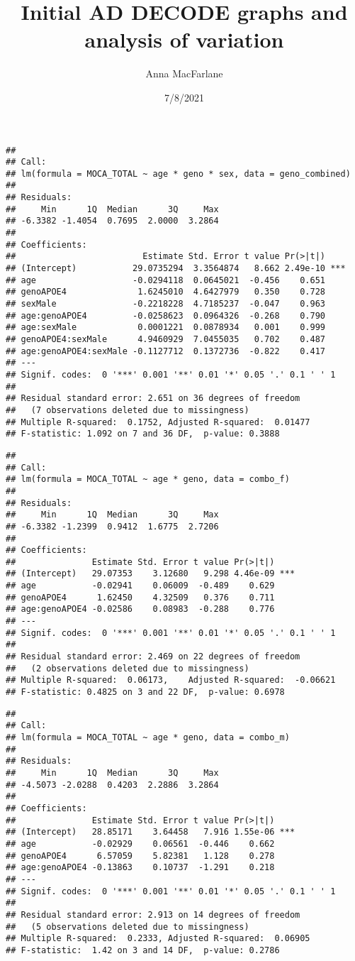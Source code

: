 \documentclass[
]{article}
\title{Initial AD DECODE graphs and analysis of variation}
\author{Anna MacFarlane}
\date{7/8/2021}
\begin{document}
\maketitle

\begin{verbatim}
## 
## Call:
## lm(formula = MOCA_TOTAL ~ age * geno * sex, data = geno_combined)
## 
## Residuals:
##     Min      1Q  Median      3Q     Max 
## -6.3382 -1.4054  0.7695  2.0000  3.2864 
## 
## Coefficients:
##                         Estimate Std. Error t value Pr(>|t|)    
## (Intercept)           29.0735294  3.3564874   8.662 2.49e-10 ***
## age                   -0.0294118  0.0645021  -0.456    0.651    
## genoAPOE4              1.6245010  4.6427979   0.350    0.728    
## sexMale               -0.2218228  4.7185237  -0.047    0.963    
## age:genoAPOE4         -0.0258623  0.0964326  -0.268    0.790    
## age:sexMale            0.0001221  0.0878934   0.001    0.999    
## genoAPOE4:sexMale      4.9460929  7.0455035   0.702    0.487    
## age:genoAPOE4:sexMale -0.1127712  0.1372736  -0.822    0.417    
## ---
## Signif. codes:  0 '***' 0.001 '**' 0.01 '*' 0.05 '.' 0.1 ' ' 1
## 
## Residual standard error: 2.651 on 36 degrees of freedom
##   (7 observations deleted due to missingness)
## Multiple R-squared:  0.1752, Adjusted R-squared:  0.01477 
## F-statistic: 1.092 on 7 and 36 DF,  p-value: 0.3888
\end{verbatim}

\begin{verbatim}
## 
## Call:
## lm(formula = MOCA_TOTAL ~ age * geno, data = combo_f)
## 
## Residuals:
##     Min      1Q  Median      3Q     Max 
## -6.3382 -1.2399  0.9412  1.6775  2.7206 
## 
## Coefficients:
##               Estimate Std. Error t value Pr(>|t|)    
## (Intercept)   29.07353    3.12680   9.298 4.46e-09 ***
## age           -0.02941    0.06009  -0.489    0.629    
## genoAPOE4      1.62450    4.32509   0.376    0.711    
## age:genoAPOE4 -0.02586    0.08983  -0.288    0.776    
## ---
## Signif. codes:  0 '***' 0.001 '**' 0.01 '*' 0.05 '.' 0.1 ' ' 1
## 
## Residual standard error: 2.469 on 22 degrees of freedom
##   (2 observations deleted due to missingness)
## Multiple R-squared:  0.06173,    Adjusted R-squared:  -0.06621 
## F-statistic: 0.4825 on 3 and 22 DF,  p-value: 0.6978
\end{verbatim}

\begin{verbatim}
## 
## Call:
## lm(formula = MOCA_TOTAL ~ age * geno, data = combo_m)
## 
## Residuals:
##     Min      1Q  Median      3Q     Max 
## -4.5073 -2.0288  0.4203  2.2886  3.2864 
## 
## Coefficients:
##               Estimate Std. Error t value Pr(>|t|)    
## (Intercept)   28.85171    3.64458   7.916 1.55e-06 ***
## age           -0.02929    0.06561  -0.446    0.662    
## genoAPOE4      6.57059    5.82381   1.128    0.278    
## age:genoAPOE4 -0.13863    0.10737  -1.291    0.218    
## ---
## Signif. codes:  0 '***' 0.001 '**' 0.01 '*' 0.05 '.' 0.1 ' ' 1
## 
## Residual standard error: 2.913 on 14 degrees of freedom
##   (5 observations deleted due to missingness)
## Multiple R-squared:  0.2333, Adjusted R-squared:  0.06905 
## F-statistic:  1.42 on 3 and 14 DF,  p-value: 0.2786
\end{verbatim}
\end{document}
